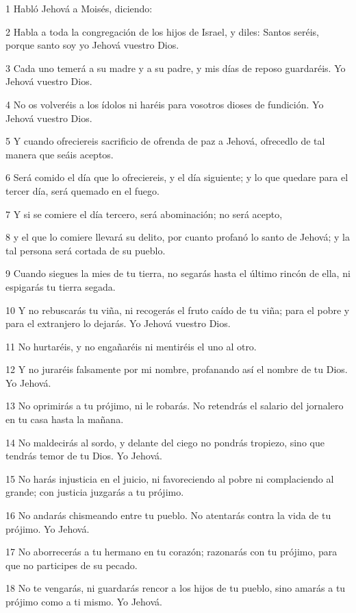 \par 1 Habló Jehová a Moisés, diciendo:
\par 2 Habla a toda la congregación de los hijos de Israel, y diles: Santos seréis, porque santo soy yo Jehová vuestro Dios.
\par 3 Cada uno temerá a su madre y a su padre, y mis días de reposo guardaréis. Yo Jehová vuestro Dios.
\par 4 No os volveréis a los ídolos ni haréis para vosotros dioses de fundición. Yo Jehová vuestro Dios.
\par 5 Y cuando ofreciereis sacrificio de ofrenda de paz a Jehová, ofrecedlo de tal manera que seáis aceptos.
\par 6 Será comido el día que lo ofreciereis, y el día siguiente; y lo que quedare para el tercer día, será quemado en el fuego.
\par 7 Y si se comiere el día tercero, será abominación; no será acepto,
\par 8 y el que lo comiere llevará su delito, por cuanto profanó lo santo de Jehová; y la tal persona será cortada de su pueblo.
\par 9 Cuando siegues la mies de tu tierra, no segarás hasta el último rincón de ella, ni espigarás tu tierra segada.
\par 10 Y no rebuscarás tu viña, ni recogerás el fruto caído de tu viña; para el pobre y para el extranjero lo dejarás. Yo Jehová vuestro Dios.
\par 11 No hurtaréis, y no engañaréis ni mentiréis el uno al otro.
\par 12 Y no juraréis falsamente por mi nombre, profanando así el nombre de tu Dios. Yo Jehová.
\par 13 No oprimirás a tu prójimo, ni le robarás. No retendrás el salario del jornalero en tu casa hasta la mañana.
\par 14 No maldecirás al sordo, y delante del ciego no pondrás tropiezo, sino que tendrás temor de tu Dios. Yo Jehová.
\par 15 No harás injusticia en el juicio, ni favoreciendo al pobre ni complaciendo al grande; con justicia juzgarás a tu prójimo.
\par 16 No andarás chismeando entre tu pueblo. No atentarás contra la vida de tu prójimo. Yo Jehová.
\par 17 No aborrecerás a tu hermano en tu corazón; razonarás con tu prójimo, para que no participes de su pecado.
\par 18 No te vengarás, ni guardarás rencor a los hijos de tu pueblo, sino amarás a tu prójimo como a ti mismo. Yo Jehová.
